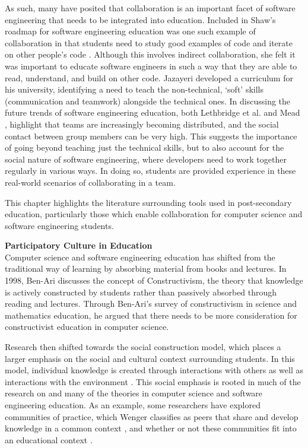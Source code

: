 As such, many have posited that collaboration is an important facet of software engineering that needs to be integrated into education. Included in Shaw’s roadmap for software engineering education was one such example of collaboration in that students need to study good examples of code and iterate on other people’s code \cite{shaw2000software}. Although this involves indirect collaboration, she felt it was important to educate software engineers in such a way that they are able to read, understand, and build on other code. Jazayeri \cite{jazayeri2004education} developed a curriculum for his university, identifying a need to teach the non-technical, `soft' skills (communication and teamwork) alongside the technical ones. In discussing the future trends of software engineering education, both Lethbridge et al. \cite{lethbridge2007improving} and Mead \cite{mead2009software}, highlight that teams are increasingly becoming distributed, and the social contact between group members can be very high. This suggests the importance of going beyond teaching just the technical skills, but to also account for the social nature of software engineering, where developers need to work together regularly in various ways. In doing so, students are provided experience in these real-world scenarios of collaborating in a team.

This chapter highlights the literature surrounding tools used in post-secondary education, particularly those which enable collaboration for computer science and software engineering students.

\textbf{Participatory Culture in Education} \\
Computer science and software engineering education has shifted from the traditional way of learning by absorbing material from books and lectures. In 1998, Ben-Ari \cite{ben1998constructivism} discusses the concept of Constructivism, the theory that knowledge is actively constructed by students rather than passively absorbed through reading and lectures. Through Ben-Ari’s survey of constructivism in science and mathematics education, he argued that there needs to be more consideration for constructivist education in computer science.

Research then shifted towards the social construction model, which places a larger emphasis on the social and cultural context surrounding students. In this model, individual knowledge is created through interactions with others as well as interactions with the environment \cite{kim2001social}. This social emphasis is rooted in much of the research on and many of the theories in computer science and software engineering education. As an example, some researchers have explored communities of practice, which Wenger classifies as peers that share and develop knowledge in a common context \cite{wenger1998communities}, and whether or not these communities fit into an educational context \cite{ben2004situated}.

